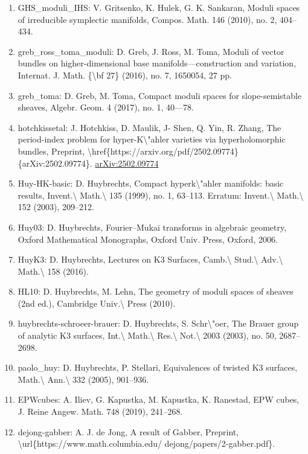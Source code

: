 \documentclass[11pt]{article}
\begin{document}
\begin{enumerate}[leftmargin=*]
  \item GHS\_moduli\_IHS: V. Gritsenko, K. Hulek, G. K. Sankaran, Moduli spaces of irreducible symplectic manifolds, Compos. Math. 146 (2010), no. 2, 404--434.
  \item greb\_ross\_toma\_moduli: D. Greb, J. Ross, M. Toma, Moduli of vector bundles on higher-dimensional base manifolds---construction and variation, Internat. J. Math. \{\textbackslash{}bf 27\} (2016), no. 7, 1650054, 27 pp.
  \item greb\_toma: D. Greb, M. Toma, Compact moduli spaces for slope-semistable sheaves, Algebr. Geom. 4 (2017), no. 1, 40---78.
  \item hotchkissetal: J. Hotchkiss, D. Maulik, J- Shen, Q. Yin, R. Zhang, The period-index problem for hyper-K\textbackslash{}"ahler varieties via hyperholomorphic bundles, Preprint, \textbackslash{}href\{https://arxiv.org/pdf/2502.09774\}\{arXiv:2502.09774\}. \href{https://arxiv.org/abs/2502.09774}{arXiv:2502.09774}
  \item Huy-HK-basic: D. Huybrechts, Compact hyperk\textbackslash{}"ahler manifolds: basic results, Invent.\textbackslash{} Math.\textbackslash{} 135 (1999), no. 1, 63--113. Erratum: Invent.\textbackslash{} Math.\textbackslash{} 152 (2003), 209--212.
  \item Huy03: D. Huybrechts, Fourier--Mukai transforms in algebraic geometry, Oxford Mathematical Monographs, Oxford Univ. Press, Oxford, 2006.
  \item HuyK3: D. Huybrechts, Lectures on K3 Surfaces, Camb.\textbackslash{} Stud.\textbackslash{} Adv.\textbackslash{} Math.\textbackslash{} 158 (2016).
  \item HL10: D. Huybrechts, M. Lehn, The geometry of moduli spaces of sheaves (2nd ed.), Cambridge Univ.\textbackslash{} Press (2010).
  \item huybrechts-schroeer-brauer: D. Huybrechts, S. Schr\textbackslash{}"oer, The Brauer group of analytic K3 surfaces, Int.\textbackslash{} Math.\textbackslash{} Res.\textbackslash{} Not.\textbackslash{} 2003 (2003), no. 50, 2687--2698.
  \item paolo\_huy: D. Huybrechts, P. Stellari, Equivalences of twisted K3 surfaces, Math.\textbackslash{} Ann.\textbackslash{} 332 (2005), 901--936.
  \item EPWcubes: A. Iliev, G. Kapustka, M. Kapustka, K. Ranestad, EPW cubes, J. Reine Angew. Math. 748 (2019), 241--268.
  \item dejong-gabber: A. J. de Jong, A result of Gabber, Preprint, \textbackslash{}url\{https://www.math.columbia.edu/ dejong/papers/2-gabber.pdf\}.

\end{enumerate}
\end{document}
